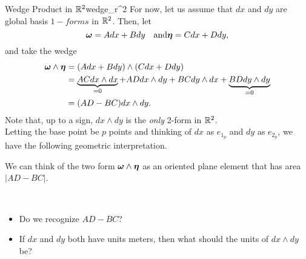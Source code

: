 \begin{ex}{Wedge Product in $\mathbb{R}^2$}{wedge_r^2}
For now, let us assume that $dx$ and $dy$ are global basis $1-forms$ in $\mathbb{R}^2$. Then, let
\[
\boldsymbol{\omega} = Adx+Bdy \quad \textrm{and} \boldsymbol{\eta} = Cdx+Ddy,
\]
and take the wedge
\begin{align*}
    \boldsymbol{\omega} \wedge \boldsymbol{\eta} &= (Adx+Bdy)\wedge (Cdx+Ddy)\\
    &=\underbrace{ACdx\wedge dx}_{=0} +ADdx\wedge dy +BC dy\wedge dx + \underbrace{BD dy\wedge dy}_{=0}\\
    &= (AD-BC)dx\wedge dy.
\end{align*}
Note that, up to a sign, $dx\wedge dy$ is the \emph{only} 2-form in $\mathbb{R}^2$.\\

Letting the base point be $p$ points and thinking of $dx$ as $e_{1_p}$ and $dy$ as $e_{2_p}$, we have the following geometric interpretation.
\begin{center}
\end{center}
We can think of the two form $\boldsymbol{\omega} \wedge \boldsymbol{\eta}$ as an oriented plane element that has area $|AD-BC|$.
\end{ex}

\begin{question}~
\begin{itemize}
    \item Do we recognize $AD-BC$?
    \item If $dx$ and $dy$ both have units meters, then what should the units of $dx\wedge dy$ be?
\end{itemize}
\end{question}

